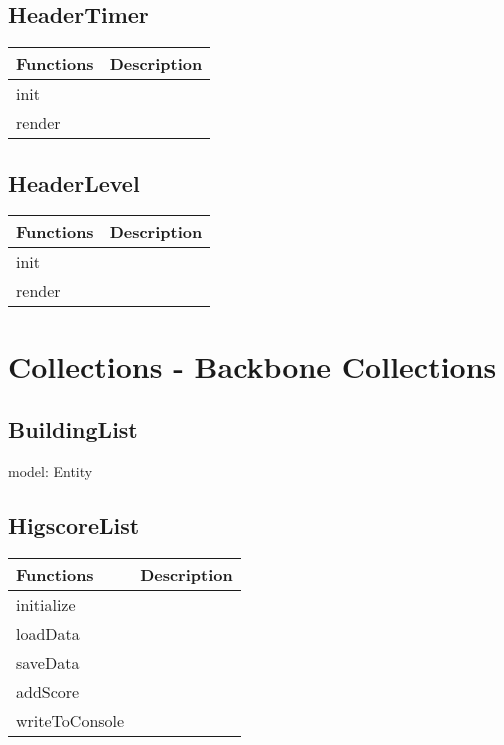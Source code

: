 \subsection*{HeaderTimer}

	\begin{table}[H]
	\begin{tabular}{p{4cm} | p{8cm} }
	\hline
	\rowcolor{gray}
	Functions & Description \\ \hline
	init & \\ \hline
	render & \\ \hline
	\end{tabular}
	\end{table}

\subsection*{HeaderLevel}

	\begin{table}[H]
	\begin{tabular}{p{4cm} | p{8cm} }
	\hline
	\rowcolor{gray}
	Functions & Description \\ \hline
	init & \\ \hline
	render & \\ \hline
	\end{tabular}
	\end{table}

\clearpage

\section{Collections - Backbone Collections}
	
\subsection*{BuildingList}

	model: Entity

\subsection*{HigscoreList}

	\begin{table}[H]
	\begin{tabular}{p{4cm} | p{8cm} }
	\hline
	\rowcolor{gray}
	Functions & Description \\ \hline
	initialize & \\ \hline
	loadData & \\ \hline
	saveData & \\ \hline
	addScore & \\ \hline
	writeToConsole & \\ \hline

	\end{tabular}
	\end{table}

